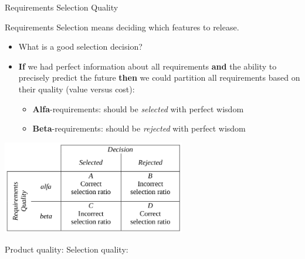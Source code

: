 \begin{Slide}{Requirements Selection Quality}

Requirements Selection means deciding which features to release.
\begin{itemize}
\item What is a good selection decision?

\item \textbf{If} we had perfect information about all requirements \textbf{and} the ability to precisely predict the future \textbf{then} we could partition all requirements based on their quality (value versus cost):
\begin{itemize}
\item \textbf{Alfa}-requirements: should be \textit{selected} with perfect wisdom
\item \textbf{Beta}-requirements: should be \textit{rejected} with perfect wisdom
\end{itemize}
\end{itemize}
\begin{center}
\includegraphics[width=0.6\textwidth]{../img/alfa-beta-reqts}
\end{center}
{
Product quality: \hfill
Selection quality:
}

\end{Slide}
